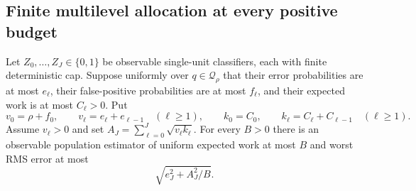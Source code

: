 \subsection{Finite multilevel allocation at every positive budget}

\begin{lemma}\label{lem:uf-poisson}
Let $Z_0,\ldots,Z_J\in\{0,1\}$ be observable single-unit classifiers,
each with finite deterministic cap. Suppose uniformly over
$q\in\mathcal Q_\rho$ that their error probabilities are at most
$e_\ell$, their false-positive probabilities are at most $f_\ell$,
and their expected work is at most $C_\ell>0$.
Put
\[
 v_0=\rho+f_0,\qquad
 v_\ell=e_\ell+e_{\ell-1}\quad(\ell\ge1),\qquad
 k_0=C_0,\qquad k_\ell=C_\ell+C_{\ell-1}\quad(\ell\ge1).
\]
Assume $v_\ell>0$ and set $A_J=\sum_{\ell=0}^J\sqrt{v_\ell k_\ell}$.
For every $B>0$ there is an observable population estimator of
uniform expected work at most $B$ and worst RMS error at most
\begin{equation}\label{eq:uf-poisson-risk}
 \sqrt{e_J^2+A_J^2/B}.
\end{equation}
\end{lemma}

